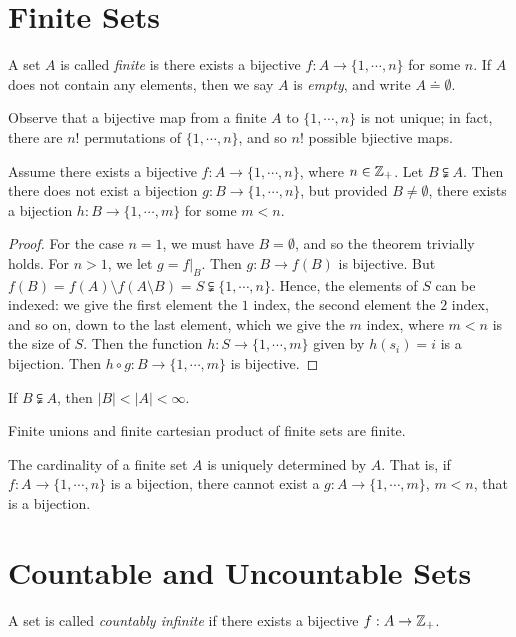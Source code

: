 \section{Finite Sets} 
\begin{definition}
	A set $A$ is called \emph{finite} is there exists a bijective
	$f: A \to \{ 1, \cdots, n\}$ for some $n$. If $A$ does not contain any
	elements, then we say $A$ is \emph{empty}, and write $A \doteq \emptyset$.
\end{definition}
Observe that a bijective map from a finite $A$ to $\{1, \cdots, n\}$ is not unique; in fact, there are $n!$ permutations of $\{1, \cdots, n\}$, and so $n!$ possible
bjiective maps. 
\begin{theorem}\label{thm:subset-bij}
	Assume there exists a bijective $f: A \to \{1, \cdots, n\}$, where $n \in
	\mathbb{Z}_{+}$. Let $B \subsetneqq A$. Then there does not exist a bijection $g: B
	\to \{1, \cdots, n\}$, but provided $B \neq \emptyset$, there exists a
	bijection $h: B \to \{1, \cdots, m\}$ for some $m < n$.	
\end{theorem}
\begin{proof}
For the case $n=1$, we must have $B = \emptyset$, and so the theorem
trivially holds. For $n>1$, we let $g = f |_{B}$. Then $g: B \to f(B)$ is bijective. But
$f(B) = f(A) \setminus f(A \setminus B) = S \subsetneqq \{1, \cdots, n\}$.
Hence, the elements of $S$ can be indexed: we give the first element the
$1$ index, the second element the $2$ index, and so on, down to the last
element, which we give the $m$ index, where $m < n$ is the size of $S$. 
Then the function $h: S \to \{1, \cdots, m\}$ given by $h(s_{i}) = i$
is a bijection. Then $h \circ g: B \to \{1, \cdots, m\}$ is bijective.
\end{proof}
\begin{corollary}
	If $B \subsetneqq A$, then $|B| < |A| < \infty$.
\end{corollary}
\begin{corollary}
	Finite unions and finite cartesian product of finite sets are finite.
\end{corollary}
\begin{corollary}
	The cardinality of a finite set $A$ is uniquely determined by $A$. That is,
	if $f: A \to \{1, \cdots, n\}$ is a bijection, there cannot exist a 
	$g: A \to \{ 1, \cdots, m\}$, $m < n$, that is a bijection.
\end{corollary}
\section{Countable and Uncountable Sets} 
\begin{definition}
A set is called \emph{countably infinite} if there exists a bijective
	$f: A \to \mathbb{Z}_{+}$. 
\end{definition}

